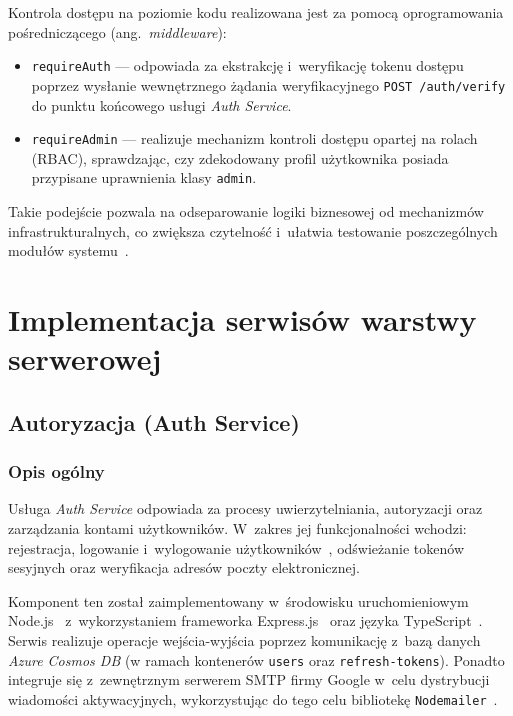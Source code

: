 \documentclass[a4paper,12pt,reqno]{article}
\begin{document}
Kontrola dostępu na poziomie kodu realizowana jest za pomocą oprogramowania pośredniczącego (ang.~\textit{middleware}):
\begin{itemize}
	\item \texttt{requireAuth} --- odpowiada za ekstrakcję i~weryfikację tokenu dostępu poprzez wysłanie wewnętrznego żądania weryfikacyjnego \texttt{POST /auth/verify} do punktu końcowego usługi \textit{Auth Service}.
	\item \texttt{requireAdmin} --- realizuje mechanizm kontroli dostępu opartej na rolach (RBAC), sprawdzając, czy zdekodowany profil użytkownika posiada przypisane uprawnienia klasy \texttt{admin}.
\end{itemize}
Takie podejście pozwala na odseparowanie logiki biznesowej od mechanizmów infrastrukturalnych, co zwiększa czytelność i~ułatwia testowanie poszczególnych modułów systemu~\cite{martin2022}.

\newpage

\section{Implementacja serwisów warstwy serwerowej}
\label{sec:backend}

\subsection{Autoryzacja (Auth Service)}

\subsubsection{Opis ogólny}

Usługa \textit{Auth Service} odpowiada za procesy uwierzytelniania, autoryzacji oraz zarządzania kontami użytkowników. W~zakres jej funkcjonalności wchodzi: rejestracja, logowanie i~wylogowanie użytkowników~\cite{newman2022}, odświeżanie tokenów sesyjnych oraz weryfikacja adresów poczty elektronicznej.

Komponent ten został zaimplementowany w~środowisku uruchomieniowym Node.js~\cite{nodejs} z~wykorzystaniem frameworka Express.js~\cite{express} oraz języka TypeScript~\cite{typescript}. Serwis realizuje operacje wejścia-wyjścia poprzez komunikację z~bazą danych \textit{Azure Cosmos DB} (w ramach kontenerów \texttt{users} oraz \texttt{refresh-tokens}). Ponadto integruje się z~zewnętrznym serwerem SMTP firmy Google w~celu dystrybucji wiadomości aktywacyjnych, wykorzystując do tego celu bibliotekę \texttt{Nodemailer}~\cite{nodemailer}.
\end{document}
